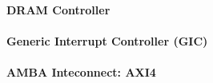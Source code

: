
\paragraph{DRAM Controller}


\paragraph{Generic Interrupt Controller (GIC)}


\paragraph{AMBA Inteconnect: AXI4}
